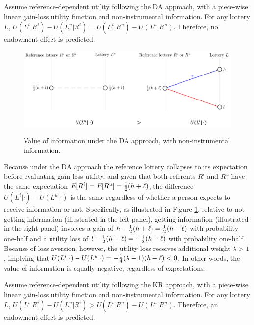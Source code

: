 \begin{prop}
  Assume reference-dependent utility following the DA approach, with a piece-wise linear gain-loss utility function and non-instrumental information. For any lottery $L$, $U(L^i|R^i)-U(L^u|R^i)=U(L^i|R^u)-U(L^u|R^u)$. Therefore, no endowment effect is predicted.
  \label{prop:nonInstrumental-DA}
\end{prop}

\begin{figure}[ht]
  \caption{Value of information under the DA approach, with non-instrumental information.}\label{fig:nonInstrumental-DA}
  \begin{center}
  {\includegraphics[width=1\textwidth]{./figures/theory_fig1.png}}
  \end{center}
\end{figure}

Because under the DA approach the reference lottery collapses to its expectation before evaluating gain-loss utility, and given that both referents $R^i$ and $R^u$ have the same expectation $E[R^i]=E[R^u]=\tfrac{1}{2}(h+\ell)$, the difference $U(L^i|\cdot)-U(L^u|\cdot)$ is the same regardless of whether a person expects to receive information or not. Specifically, as illustrated in Figure \ref{fig:nonInstrumental-DA}, relative to not getting information (illustrated in the left panel), getting information (illustrated in the right panel) involves a gain of $h-\tfrac{1}{2}(h+\ell)=\tfrac{1}{2}(h-\ell)$ with probability one-half and a utility loss of $l-\tfrac{1}{2}(h+\ell)=-\tfrac{1}{2}(h-\ell)$ with probability one-half. Because of loss aversion, however, the utility loss receives additional weight $\lambda>1$, implying that $U(L^i|\cdot)-U(L^u|\cdot)=-\tfrac{1}{4}(\lambda-1)(h-\ell)<0$. In other words, the value of information is equally negative, regardless of expectations.

\FloatBarrier

\begin{prop}
  Assume reference-dependent utility following the KR approach, with a piece-wise linear gain-loss utility function and non-instrumental information. For any lottery $L$, $U(L^i|R^i)-U(L^u|R^i)>U(L^i|R^u)-U(L^u|R^u)$. Therefore, an endowment effect is predicted.
  \label{prop:nonInstrumental-KR}
\end{prop}

